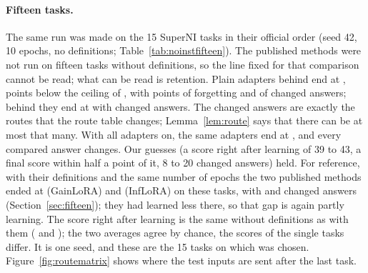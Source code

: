 \begin{table}[t]
  \caption{Routes of the rules used in the GPU run, written before the run, for the five-task sequence (500 test inputs, 400 of the first four tasks compared) and for the 15 SuperNI tasks. Columns: test inputs not at their own task after the last task, out of all test inputs; routes that changed between the arrival of their task and the end, out of those compared; audit $H/m$ and 95\% bound (Proposition~\ref{prop:audit}, averaged over all tasks of the sequence, the last one included), where valid. The last row of each part sends every input to its own task.}
  \label{tab:routesgpu}
  \centering
  
\end{table}

\paragraph{Fifteen tasks.} The same run was made on the 15 SuperNI tasks in their official order (seed 42, 10 epochs, no definitions; Table~\ref{tab:noinstfifteen}).
The published methods were not run on fifteen tasks without definitions, so the line fixed for that comparison cannot be read; what can be read is retention.
Plain adapters behind \recog{} end at \AudFifteenNoDefRidgeAP{}, \AudFifteenNoDefRidgeBelowOwn{} points below the ceiling of \AudFifteenNoDefOwnAP{}, with \AudFifteenNoDefRidgeFT{} points of forgetting and \AudFifteenNoDefRidgeChanged{} of \AudFifteenNoDefCompared{} changed answers; behind \handicap{} they end at \AudFifteenNoDefHandicapAP{} with \AudFifteenNoDefHandicapChanged{} changed answers.
The changed answers are exactly the routes that the route table changes; Lemma~\ref{lem:route} says that there can be at most that many.
With all adapters on, the same adapters end at \AudFifteenNoDefPlainAP{}, and every compared answer changes.
Our guesses (a score right after learning of 39 to 43, a final score within half a point of it, 8 to 20 changed answers) held.
For reference, with their definitions and the same number of epochs the two published methods ended at \AudFifteenDefGainloraAP{} (GainLoRA) and \AudFifteenDefInfloraAP{} (InfLoRA) on these tasks, with \AudFifteenDefGainloraChanged{} and \AudFifteenDefInfloraChanged{} changed answers (Section~\ref{sec:fifteen}); they had learned less there, so that gap is again partly learning.
The score right after learning is the same without definitions as with them (\AudFifteenNoDefOwnLearned{} and \AudFifteenDefCertLearned{}); the two averages agree by chance, the scores of the single tasks differ.
It is one seed, and these are the 15 tasks on which \recog{} was chosen. Figure~\ref{fig:routematrix} shows where the test inputs are sent after the last task.

